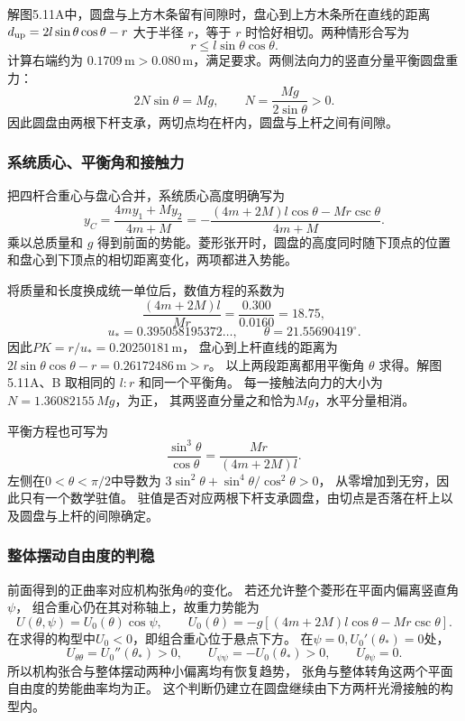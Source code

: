 \documentclass[UTF8,fontset=fandol,a4paper,11pt]{ctexart}
\begin{document}
解图5.11A中，圆盘与上方木条留有间隙时，盘心到上方木条所在直线的距离 $d_{\rm up}=2l\sin\theta\cos\theta-r$ 大于半径 $r$，等于 $r$ 时恰好相切。两种情形合写为
\[
 r\le l\sin\theta\cos\theta.
\]
计算右端约为 $0.1709\,\mathrm m>0.080\,\mathrm m$，满足要求。两侧法向力的竖直分量平衡圆盘重力：
\[
 2N\sin\theta=Mg,\qquad N=\frac{Mg}{2\sin\theta}>0.
\]
因此圆盘由两根下杆支承，两切点均在杆内，圆盘与上杆之间有间隙。
\subsubsection*{系统质心、平衡角和接触力}
把四杆合重心与盘心合并，系统质心高度明确写为
\[
y_C=\frac{4my_1+My_2}{4m+M}
=-\frac{(4m+2M)l\cos\theta-Mr\csc\theta}{4m+M}.
\]
乘以总质量和 $g$ 得到前面的势能。菱形张开时，圆盘的高度同时随下顶点的位置和盘心到下顶点的相切距离变化，两项都进入势能。

将质量和长度换成统一单位后，数值方程的系数为
\[
\frac{(4m+2M)l}{Mr}=\frac{0.300}{0.0160}=18.75,
\]
\[
u_*=0.395058195372\ldots,\qquad
\theta=21.55690419^\circ.
\]
因此$PK=r/u_*=0.20250181\,\mathrm m$，
盘心到上杆直线的距离为
$2l\sin\theta\cos\theta-r=0.26172486\,\mathrm m>r$。
以上两段距离都用平衡角 $\theta$ 求得。解图5.11A、B 取相同的 $l:r$ 和同一个平衡角。
每一接触法向力的大小为$N=1.36082155\,Mg$，为正，
其两竖直分量之和恰为$Mg$，水平分量相消。

平衡方程也可写为
\[
\frac{\sin^3\theta}{\cos\theta}
=\frac{Mr}{(4m+2M)l}.
\]
左侧在$0<\theta<\pi/2$中导数为
$3\sin^2\theta+\sin^4\theta/\cos^2\theta>0$，
从零增加到无穷，因此只有一个数学驻值。
驻值是否对应两根下杆支承圆盘，由切点是否落在杆上以及圆盘与上杆的间隙确定。

\subsubsection*{整体摆动自由度的判稳}
前面得到的正曲率对应机构张角$\theta$的变化。
若还允许整个菱形在平面内偏离竖直角$\psi$，
组合重心仍在其对称轴上，故重力势能为
\[
U(\theta,\psi)=U_0(\theta)\cos\psi,
\qquad
U_0(\theta)=-g[(4m+2M)l\cos\theta-Mr\csc\theta].
\]
在求得的构型中$U_0<0$，即组合重心位于悬点下方。
在$\psi=0,U_0'(\theta_*)=0$处，
\[
U_{\theta\theta}=U_0''(\theta_*)>0,\qquad
U_{\psi\psi}=-U_0(\theta_*)>0,\qquad
U_{\theta\psi}=0.
\]
所以机构张合与整体摆动两种小偏离均有恢复趋势，
张角与整体转角这两个平面自由度的势能曲率均为正。
这个判断仍建立在圆盘继续由下方两杆光滑接触的构型内。



\end{document}
